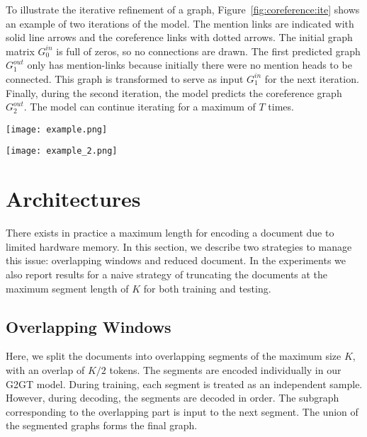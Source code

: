 \documentclass[11pt]{article}
\begin{document}
To illustrate the iterative refinement of a graph, Figure~\ref{fig:coreference:ite} shows an example of two iterations of the model. The mention links are indicated with solid line arrows and the coreference links with dotted arrows. The initial graph matrix $G_0^{in}$ is full of zeros, so no connections are drawn. The first predicted graph $G_1^{out}$ only has mention-links because initially there were no mention heads to be connected. This graph is transformed to serve as input $G_1^{in}$ for the next iteration. Finally, during the second iteration, the model predicts the coreference graph $G_2^{out}$. The model can continue iterating for a maximum of $T$ times. 
 

\begin{figure*}
	\center
	\texttt{[image: example.png]}
	\caption{Example of iterations with G2GT.}
	\label{fig:coreference:ite}
\end{figure*}

\begin{figure*}
	\center
	\texttt{[image: example\_2.png]}
	\caption{Example of iterations with G2GT in two stages.}
	\label{fig:coreference:ite2}
\end{figure*}

 


\section{Architectures} 
\label{sec:coreference:arch}

There exists in practice a maximum length for encoding a document due to limited hardware memory. In this section, we describe two strategies to manage this issue: overlapping windows and reduced document. 
In the experiments we also report results for a naive strategy of truncating the documents at the maximum segment length of $K$ for both training and testing.

\subsection{Overlapping Windows}
Here, we split the documents into overlapping segments of the maximum size $K$, with an overlap of $K/2$ tokens. The segments are encoded individually in our G2GT model. During training, each segment is treated as an independent sample. However, during decoding, the segments are decoded in order. The subgraph corresponding to the overlapping part is input to the next segment. 
The union of the segmented graphs forms the final graph.         
\end{document}
